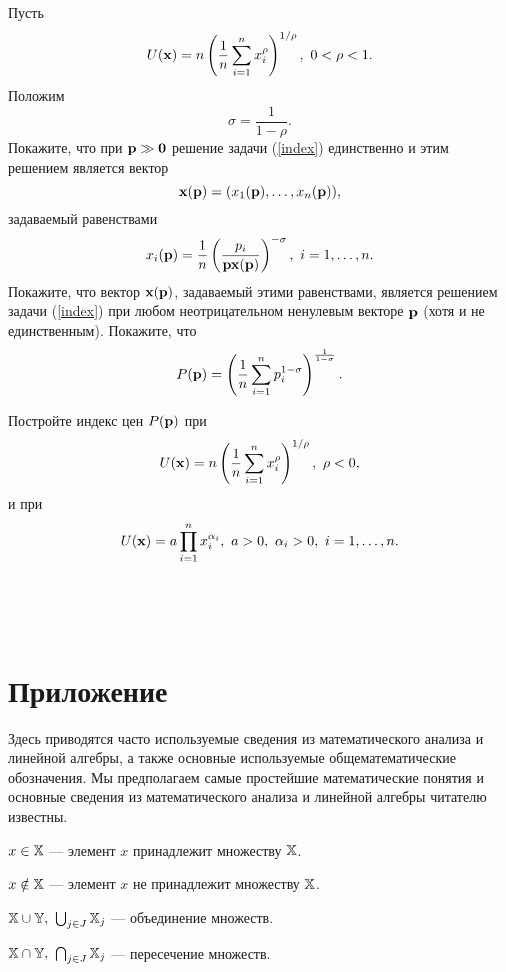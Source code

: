     \begin{exer}
    Пусть
    \[U(\mathbf{x})=n\left(\frac{1}{n}\sum_{i=1}^{n}x_{i}^{\rho}\right)^{1/\rho}, \ 0<\rho<1.\]
    Положим
    \[\sigma=\frac{1}{1-\rho}.\]
    Покажите, что при $\mathbf{p}\gg\mathbf{0}$ решение задачи (\ref{index})
    единственно и этим решением является вектор
    \[\mathbf{x}(\mathbf{p})=(x_{1}(\mathbf{p}),\ldots,x_{n}(\mathbf{p})),\]
    задаваемый равенствами
    \[x_{i}(\mathbf{p})=\frac{1}{n}\left(\frac{p_{i}}{\mathbf{p}\mathbf{x}(\mathbf{p})}\right)^{-\sigma},
    \ i=1,\ldots,n.\]
    Покажите, что вектор $\mathbf{x}(\mathbf{p})$, задаваемый этими
    равенствами, является решением задачи (\ref{index}) при любом
    неотрицательном  ненулевым векторе $\mathbf{p}$ (хотя и не
    единственным).
    Покажите, что
    \[P(\mathbf{p})=\left(\frac{1}{n}\sum_{i=1}^{n}p_{i}^{1-\sigma}\right)^{\frac{1}{1-\sigma}}.\]
    \end{exer}


     \begin{exer}
    Постройте индекс цен $P(\mathbf{p})$ при
    \[U(\mathbf{x})=n\left(\frac{1}{n}\sum_{i=1}^{n}x_{i}^{\rho}\right)^{1/\rho}, \ \rho<0,\]
    и при
    \[U(\vc{x})=a\prod_{i=1}^{n}x_{i}^{\alpha_{i}}, \ a>0, \ \alpha_{i}>0, \ i=1,\ldots,n.\]

     \end{exer}

    \








\





\chapter{Приложение}


    Здесь приводятся часто используемые сведения из математического
    анализа и линейной алгебры, а также основные используемые
    общематематические обозначения. Мы предполагаем самые простейшие
    математические понятия и основные сведения из
    математического анализа и линейной алгебры читателю
    известны.

    $x\in\mathbb{X}$ --- элемент $x$ принадлежит множеству $\mathbb{X}$.


    $x\notin\mathbb{X}$ --- элемент $x$ не принадлежит множеству $\mathbb{X}$.

    $\mathbb{X}\cup\mathbb{Y}, \ \bigcup_{j\in J}\mathbb{X}_{j}$ --- объединение множеств.

     $\mathbb{X}\cap\mathbb{Y}, \ \bigcap_{j\in J}\mathbb{X}_{j}$ --- пересечение множеств.

